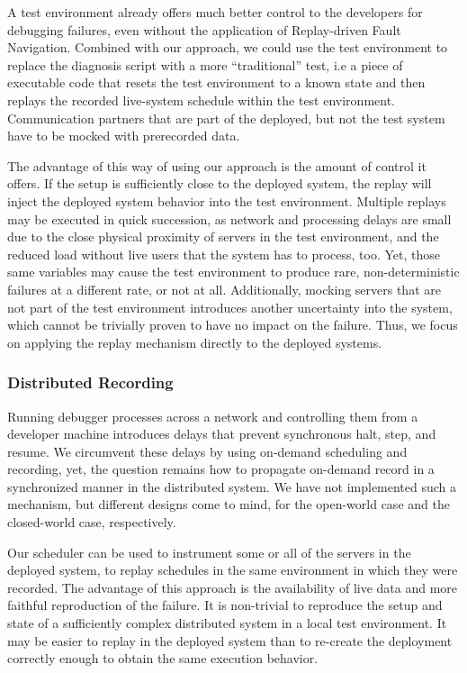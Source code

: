 A test environment already offers much better control to the
developers for debugging failures, even without the application of
Replay-driven Fault Navigation. Combined with our approach, we could
use the test environment to replace the diagnosis script with a more
"`traditional"' test, i.e a piece of executable code that resets the
test environment to a known state and then replays the recorded
live-system schedule within the test environment. Communication
partners that are part of the deployed, but not the test system have
to be mocked with prerecorded data.

The advantage of this way of using our approach is the amount of
control it offers. If the setup is sufficiently close to the deployed
system, the replay will inject the deployed system behavior into the
test environment. Multiple replays may be executed in quick
succession, as network and processing delays are small due to the
close physical proximity of servers in the test environment, and the
reduced load without live users that the system has to process, too.
Yet, those same variables may cause the test environment to produce
rare, non-deterministic failures at a different rate, or not at
all. Additionally, mocking servers that are not part of the test
environment introduces another uncertainty into the system, which
cannot be trivially proven to have no impact on the failure. Thus, we
focus on applying the replay mechanism directly to the deployed
systems.

\subsubsection{Distributed Recording}
\label{sec:distr-repl-reord}
\label{sec:distributed-scheduling}

Running debugger processes across a network and controlling them from
a developer machine introduces delays that prevent synchronous halt,
step, and resume. We circumvent these delays by using on-demand
scheduling and recording, yet, the question remains how to propagate
on-demand record in a synchronized manner in the distributed
system. We have not implemented such a mechanism, but different
designs come to mind, for the open-world case and the closed-world
case, respectively.

Our scheduler can be used to instrument some or all of the servers in
the deployed system, to replay schedules in the same environment in
which they were recorded. The advantage of this approach is the
availability of live data and more faithful reproduction of the
failure. It is non-trivial to reproduce the setup and state of a
sufficiently complex distributed system in a local test
environment. It may be easier to replay in the deployed system than to
re-create the deployment correctly enough to obtain the same execution
behavior.

